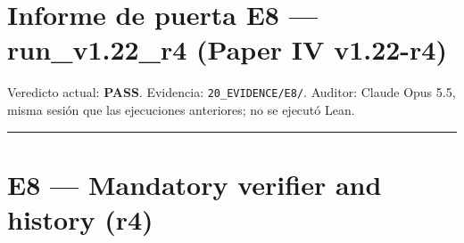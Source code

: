 \documentclass[
]{article}
\author{}
\date{}
\begin{document}
\section{Informe de puerta E8 --- run\_v1.22\_r4 (Paper IV
v1.22-r4)}\label{informe-de-puerta-e8--run_v122_r4-paper-iv-v122-r4}

Veredicto actual: \textbf{PASS}. Evidencia: \texttt{20\_EVIDENCE/E8/}.
Auditor: Claude Opus 5.5, misma sesión que las ejecuciones anteriores;
no se ejecutó Lean.

\begin{center}\rule{0.5\linewidth}{0.5pt}\end{center}

\section{E8 --- Mandatory verifier and history
(r4)}\label{e8--mandatory-verifier-and-history-r4}
\end{document}
